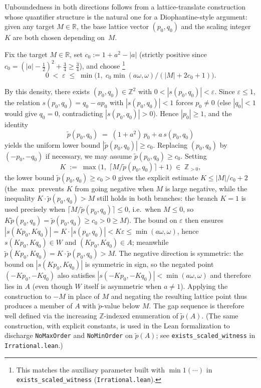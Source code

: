 \documentclass[11pt,reqno]{amsart}
\theoremstyle{plain}
\theoremstyle{definition}
\theoremstyle{remark}
\begin{document}
Unboundedness in both directions follows from a lattice-translate
construction whose quantifier structure is the natural one for a
Diophantine-style argument: given any target \(M \in \mathbb{R}\), the
base lattice vector \((p_0, q_0)\) and the scaling integer \(K\) are
both chosen depending on~\(M\).

Fix the target \(M \in \mathbb{R}\), set
\(c_0 := 1 + a^2 - |a|\) (strictly positive since
\(c_0 = (|a| - \tfrac12)^2 + \tfrac34 \ge \tfrac34\)),
and choose%
\footnote{This matches the auxiliary parameter built with
\(\min 1(\cdots)\) in \texttt{exists\_scaled\_witness}
(\texttt{Irrational.lean}).}
\[
    0 \;<\; \varepsilon \;\le\;
    \min\!\bigl(1,\;
      c_0 \min(a\omega, \omega) / (|M| + 2 c_0 + 1)\bigr).
\]

By this density, there exists
\((p_0, q_0) \in \mathbb{Z}^2\) with
\(0 < |s(p_0, q_0)| < \varepsilon\).  Since \(\varepsilon \le 1\), the
relation \(s(p_0, q_0) = q_0 - a p_0\) with \(|s(p_0, q_0)| < 1\) forces
\(p_0 \ne 0\) (else \(|q_0| < 1\) would give \(q_0 = 0\), contradicting
\(|s(p_0, q_0)| > 0\)).  Hence \(|p_0| \ge 1\), and the identity
\[
    \tilde p(p_0, q_0) \;=\; (1 + a^2)\, p_0 + a\, s(p_0, q_0)
\]
yields the uniform lower bound \(|\tilde p(p_0, q_0)| \ge c_0\).
Replacing \((p_0, q_0)\) by \((-p_0, -q_0)\) if necessary, we may assume
\(\tilde p(p_0, q_0) \ge c_0\).  Setting
\[
    K \;:=\; \max\!\bigl(1,\;\lceil M / \tilde p(p_0, q_0) \rceil + 1\bigr)
    \;\in\;\mathbb{Z}_{>0},
\]
the lower bound \(\tilde p(p_0, q_0) \ge c_0 > 0\) gives the explicit
estimate \(K \le |M|/c_0 + 2\) (the \(\max\) prevents \(K\) from going
negative when \(M\) is large negative, while the inequality
\(K \cdot \tilde p(p_0, q_0) > M\) still holds in both branches: the
branch \(K = 1\) is used precisely when \(\lceil M/\tilde p(p_0,q_0)\rceil
\le 0\), i.e.\ when \(M \le 0\), so \(K \tilde p(p_0,q_0) = \tilde
p(p_0,q_0) \ge c_0 > 0 \ge M\)).  The bound on \(\varepsilon\) then
ensures
\(|s(K p_0, K q_0)| = K \cdot |s(p_0, q_0)| < K \varepsilon
  \le \min(a\omega, \omega)\),
hence \(s(K p_0, K q_0) \in W\) and \((K p_0, K q_0) \in A\);
meanwhile
\(\tilde p(K p_0, K q_0) = K \cdot \tilde p(p_0, q_0) > M\).  The
negative direction is symmetric: the bound on \(|s(K p_0, K q_0)|\) is
symmetric in sign, so the negated point \((-K p_0, -K q_0)\) also
satisfies \(|s(-K p_0, -K q_0)| < \min(a\omega, \omega)\) and therefore
lies in \(A\) (even though \(W\) itself is asymmetric when \(a\ne 1\)).
Applying the construction to \(-M\) in place of \(M\) and negating the
resulting lattice point thus produces a member of \(A\) with
\(\tilde p\)-value below \(M\).  The gap sequence is therefore
well defined via the increasing \(\mathbb{Z}\)-indexed enumeration of
\(\tilde p(A)\).  (The same construction, with explicit constants, is
used in the Lean formalization to discharge \texttt{NoMaxOrder} and
\texttt{NoMinOrder} on \(\tilde p(A)\); see
\texttt{exists\_scaled\_witness} in \texttt{Irrational.lean}.)
\end{document}
